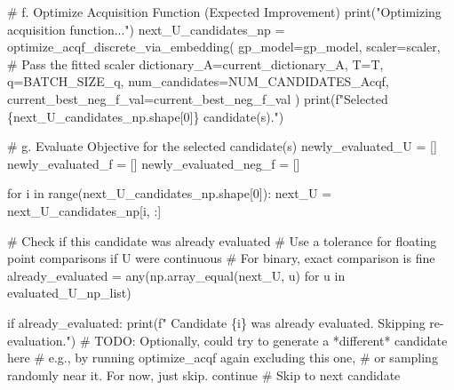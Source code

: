 \documentclass[
  letterpaper,
  DIV=11,
  numbers=noendperiod]{scrartcl}
\newenvironment{Shaded}{\begin{snugshade}}{\end{snugshade}}
\newcommand{\AlertTok}[1]{\textcolor[rgb]{0.68,0.00,0.00}{#1}}
\newcommand{\BuiltInTok}[1]{\textcolor[rgb]{0.00,0.23,0.31}{#1}}
\newcommand{\CommentTok}[1]{\textcolor[rgb]{0.37,0.37,0.37}{#1}}
\newcommand{\ControlFlowTok}[1]{\textcolor[rgb]{0.00,0.23,0.31}{#1}}
\newcommand{\DecValTok}[1]{\textcolor[rgb]{0.68,0.00,0.00}{#1}}
\newcommand{\KeywordTok}[1]{\textcolor[rgb]{0.00,0.23,0.31}{#1}}
\newcommand{\NormalTok}[1]{\textcolor[rgb]{0.00,0.23,0.31}{#1}}
\newcommand{\OperatorTok}[1]{\textcolor[rgb]{0.37,0.37,0.37}{#1}}
\newcommand{\SpecialCharTok}[1]{\textcolor[rgb]{0.37,0.37,0.37}{#1}}
\newcommand{\SpecialStringTok}[1]{\textcolor[rgb]{0.13,0.47,0.30}{#1}}
\newcommand{\StringTok}[1]{\textcolor[rgb]{0.13,0.47,0.30}{#1}}
\begin{document}
\begin{Shaded}
\begin{Highlighting}[]
    \CommentTok{\# f. Optimize Acquisition Function (Expected Improvement)}
    \BuiltInTok{print}\NormalTok{(}\StringTok{"Optimizing acquisition function..."}\NormalTok{)}
\NormalTok{    next\_U\_candidates\_np }\OperatorTok{=}\NormalTok{ optimize\_acqf\_discrete\_via\_embedding(}
\NormalTok{        gp\_model}\OperatorTok{=}\NormalTok{gp\_model,}
\NormalTok{        scaler}\OperatorTok{=}\NormalTok{scaler, }\CommentTok{\# Pass the fitted scaler}
\NormalTok{        dictionary\_A}\OperatorTok{=}\NormalTok{current\_dictionary\_A,}
\NormalTok{        T}\OperatorTok{=}\NormalTok{T,}
\NormalTok{        q}\OperatorTok{=}\NormalTok{BATCH\_SIZE\_q,}
\NormalTok{        num\_candidates}\OperatorTok{=}\NormalTok{NUM\_CANDIDATES\_Acqf,}
\NormalTok{        current\_best\_neg\_f\_val}\OperatorTok{=}\NormalTok{current\_best\_neg\_f\_val}
\NormalTok{    )}
    \BuiltInTok{print}\NormalTok{(}\SpecialStringTok{f"Selected }\SpecialCharTok{\{}\NormalTok{next\_U\_candidates\_np}\SpecialCharTok{.}\NormalTok{shape[}\DecValTok{0}\NormalTok{]}\SpecialCharTok{\}}\SpecialStringTok{ candidate(s)."}\NormalTok{)}

    \CommentTok{\# g. Evaluate Objective for the selected candidate(s)}
\NormalTok{    newly\_evaluated\_U }\OperatorTok{=}\NormalTok{ []}
\NormalTok{    newly\_evaluated\_f }\OperatorTok{=}\NormalTok{ []}
\NormalTok{    newly\_evaluated\_neg\_f }\OperatorTok{=}\NormalTok{ []}

    \ControlFlowTok{for}\NormalTok{ i }\KeywordTok{in} \BuiltInTok{range}\NormalTok{(next\_U\_candidates\_np.shape[}\DecValTok{0}\NormalTok{]):}
\NormalTok{        next\_U }\OperatorTok{=}\NormalTok{ next\_U\_candidates\_np[i, :]}

        \CommentTok{\# Check if this candidate was already evaluated}
        \CommentTok{\# Use a tolerance for floating point comparisons if U were continuous}
        \CommentTok{\# For binary, exact comparison is fine}
\NormalTok{        already\_evaluated }\OperatorTok{=} \BuiltInTok{any}\NormalTok{(np.array\_equal(next\_U, u) }\ControlFlowTok{for}\NormalTok{ u }\KeywordTok{in}\NormalTok{ evaluated\_U\_np\_list)}

        \ControlFlowTok{if}\NormalTok{ already\_evaluated:}
            \BuiltInTok{print}\NormalTok{(}\SpecialStringTok{f"  Candidate }\SpecialCharTok{\{}\NormalTok{i}\SpecialCharTok{\}}\SpecialStringTok{ was already evaluated. Skipping re{-}evaluation."}\NormalTok{)}
            \CommentTok{\# }\AlertTok{TODO}\CommentTok{: Optionally, could try to generate a *different* candidate here}
            \CommentTok{\#       e.g., by running optimize\_acqf again excluding this one,}
            \CommentTok{\#       or sampling randomly near it. For now, just skip.}
            \ControlFlowTok{continue} \CommentTok{\# Skip to next candidate}


\end{Highlighting}
\end{Shaded}
\end{document}
